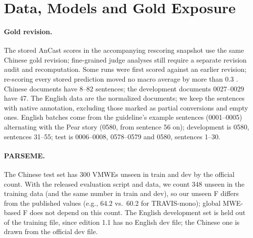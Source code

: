 \section{Data, Models and Gold Exposure}
\label{app:exposure}
\paragraph{Gold revision.} The stored AnCast scores in the accompanying rescoring snapshot use the same Chinese gold revision; fine-grained judge analyses still require a separate revision audit and recomputation. Some runs were first scored against an earlier revision; re-scoring every stored prediction moved no macro average by more than 0.3 \F. Chinese documents have 8--82 sentences; the development documents 0027--0029 have 47. The English data are the normalized  documents; we keep the sentences with native annotation, excluding those marked as partial conversions and empty ones. English batches come from the guideline's example sentences (0001--0005) alternating with the Pear story (0580, from sentence 56 on); development is 0580, sentences 31--55; test is 0006--0008, 0578--0579 and 0580, sentences 1--30.

\paragraph{PARSEME.} The Chinese test set has 300 VMWEs unseen in train and dev by the official count. With the released evaluation script and data, we count 348 unseen in the training data (and the same number in train and dev), so our unseen F differs from the published values (e.g., 64.2 vs.\ 60.2 for TRAVIS-mono); global MWE-based F does not depend on this count. The English development set is held out of the training file, since edition 1.1 has no English dev file; the Chinese one is drawn from the official dev file.

